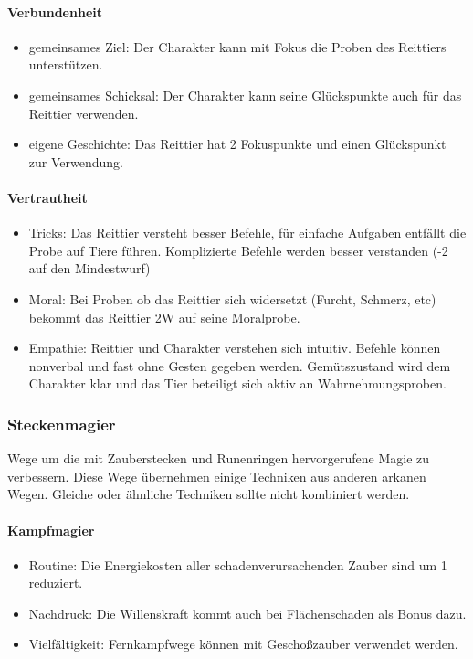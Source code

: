\documentclass{article}
\begin{document}
\paragraph{Verbundenheit}

\begin{itemize}
\item gemeinsames Ziel: Der Charakter kann mit Fokus die Proben des Reittiers unterstützen.
\item gemeinsames Schicksal: Der Charakter kann seine Glückspunkte auch für das Reittier verwenden.
\item eigene Geschichte: Das Reittier hat 2 Fokuspunkte und einen Glückspunkt zur Verwendung.
\end{itemize}

\paragraph{Vertrautheit}

\begin{itemize}
\item Tricks: Das Reittier versteht besser Befehle, für einfache Aufgaben entfällt die Probe auf Tiere führen. Komplizierte Befehle werden besser verstanden (-2 auf den Mindestwurf)
\item Moral: Bei Proben ob das Reittier sich widersetzt (Furcht, Schmerz, etc) bekommt das Reittier 2W auf seine Moralprobe.
\item Empathie: Reittier und Charakter verstehen sich intuitiv. Befehle können nonverbal und fast ohne Gesten gegeben werden. Gemütszustand wird dem Charakter klar und das Tier beteiligt sich aktiv an Wahrnehmungsproben.
\end{itemize}

\subsubsection{Steckenmagier}

Wege um die mit Zauberstecken und Runenringen hervorgerufene Magie zu verbessern. Diese Wege übernehmen einige
Techniken aus anderen arkanen Wegen. Gleiche oder ähnliche Techniken sollte nicht kombiniert werden.

\paragraph{Kampfmagier}

\begin{itemize}
\item Routine: Die Energiekosten aller schadenverursachenden Zauber sind um 1 reduziert.
\item Nachdruck: Die Willenskraft kommt auch bei Flächenschaden als Bonus dazu.
\item Vielfältigkeit: Fernkampfwege können mit Geschoßzauber verwendet werden.
\end{itemize}
\end{document}
